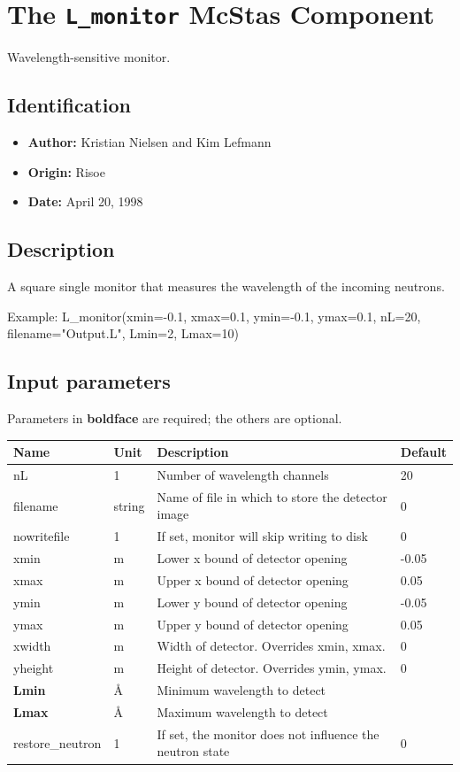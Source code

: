\section{The \texttt{L\_monitor} McStas Component}
Wavelength-sensitive monitor.

\subsection*{Identification}
\begin{itemize}
  \item \textbf{Author:} Kristian Nielsen and Kim Lefmann
  \item \textbf{Origin:} Risoe
  \item \textbf{Date:} April 20, 1998
\end{itemize}

\subsection*{Description}
A square single monitor that measures the wavelength of the incoming neutrons.

Example: L\_monitor(xmin=-0.1, xmax=0.1, ymin=-0.1, ymax=0.1, nL=20, filename="Output.L", Lmin=2, Lmax=10)

\subsection*{Input parameters}
Parameters in \textbf{boldface} are required; the others are optional.

\begin{longtable}{p{}p{}p{}p{}}
\toprule
\textbf{Name} & \textbf{Unit} & \textbf{Description} & \textbf{Default} \\
\midrule
\endhead
nL & 1 & Number of wavelength channels & 20 \\
filename & string & Name of file in which to store the detector image & 0 \\
nowritefile & 1 & If set, monitor will skip writing to disk & 0 \\
xmin & m & Lower x bound of detector opening & -0.05 \\
xmax & m & Upper x bound of detector opening & 0.05 \\
ymin & m & Lower y bound of detector opening & -0.05 \\
ymax & m & Upper y bound of detector opening & 0.05 \\
xwidth & m & Width of detector. Overrides xmin, xmax. & 0 \\
yheight & m & Height of detector. Overrides ymin, ymax. & 0 \\
\textbf{Lmin} & \AA{} & Minimum wavelength to detect &  \\
\textbf{Lmax} & \AA{} & Maximum wavelength to detect &  \\
restore\_neutron & 1 & If set, the monitor does not influence the neutron state & 0 \\
\bottomrule
\end{longtable}

